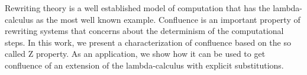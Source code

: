 Rewriting theory is a well established model of computation that has
the lambda-calculus as the most well known example. Confluence is an
important property of rewriting systems that concerns about the
determinism of the computational steps. In this work, we present a
characterization of confluence based on the so called Z property. As
an application, we show how it can be used to get confluence of an
extension of the lambda-calculus with explicit substitutions.
